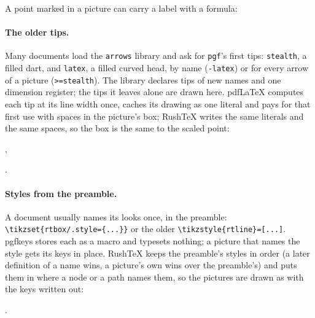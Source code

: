 \documentclass{article}
\numberwithin{equation}{section}
\theoremstyle{definition}
\theoremstyle{remark}
\begin{document}
A point marked in a picture can carry a label with a formula:

\paragraph{The older tips.} Many documents load the \texttt{arrows} library and ask for
\texttt{pgf}'s first tips: \texttt{stealth}, a filled dart, and \texttt{latex}, a filled
curved head, by name (\texttt{-latex}) or for every arrow of a picture
(\texttt{>=stealth}). The library declares tips of new names and one dimension register;
the tips it leaves alone are drawn here. pdfLaTeX computes each tip at its line width
once, caches its drawing as one literal and pays for that first use with spaces in the
picture's box; RushTeX writes the same literals and the same spaces, so the box is the
same to the scaled point:
, .

\paragraph{Styles from the preamble.} A document usually names its looks once, in the
preamble: \verb|\tikzset{rtbox/.style={...}}| or the older
\verb|\tikzstyle{rtline}=[...]|. pgfkeys stores each as a macro and typesets nothing;
a picture that names the style gets its keys in place. RushTeX keeps the preamble's styles
in order (a later definition of a name wins, a picture's own wins over the preamble's) and
puts them in where a node or a path names them, so the pictures are drawn as with the keys
written out:
.
\end{document}

